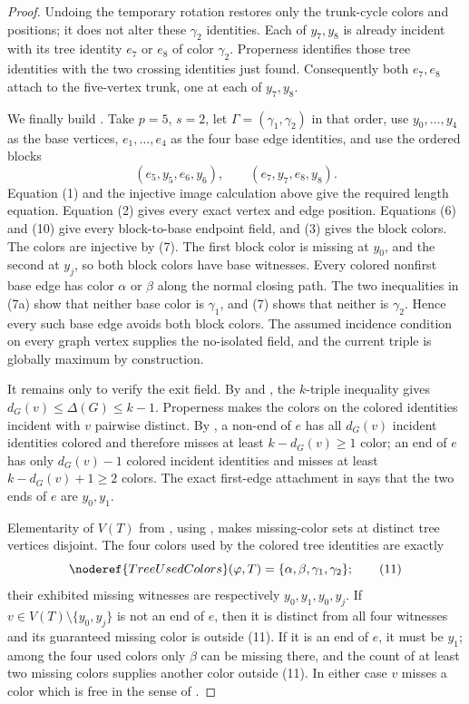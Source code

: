 \begin{proof}
Undoing the temporary rotation restores only the trunk-cycle colors and
positions; it does not alter these $\gamma_2$ identities.  Each of
$y_7,y_8$ is already incident with its tree identity $e_7$ or $e_8$ of
color $\gamma_2$.  Properness identifies those tree identities with the
two crossing identities just found.  Consequently both $e_7,e_8$ attach
to the five-vertex trunk, one at each of $y_7,y_8$.                

We finally build .  Take $p=5$,
$s=2$, let $\Gamma=(\gamma_1,\gamma_2)$ in that order, use
$y_0,\ldots,y_4$ as the base vertices, $e_1,\ldots,e_4$ as the four base
edge identities, and use the ordered blocks
\[
 (e_5,y_5,e_6,y_6),\qquad(e_7,y_7,e_8,y_8).
\]
Equation (1) and the injective image calculation above give the required
length equation.  Equation (2) gives every exact vertex and edge
position.  Equations (6) and (10) give every block-to-base endpoint
field, and (3) gives the block colors.  The colors are injective by (7).
The first block color is missing at $y_0$, and the second at $y_j$, so
both block colors have base witnesses.  Every colored nonfirst base edge
has color $\alpha$ or $\beta$ along the normal closing path.  The two
inequalities in (7a) show that neither base color is $\gamma_1$, and (7)
shows that neither is $\gamma_2$.  Hence every such base edge avoids both
block colors.  The assumed
incidence condition on every graph vertex supplies the no-isolated field,
and the current triple is globally maximum by construction.

It remains only to verify the exit field.  By  and
, the $k$-triple inequality gives
$d_G(v)\leq\Delta(G)\leq k-1$.  Properness makes the colors on the colored
identities incident with $v$ pairwise distinct.  By
, a non-end of $e$ has all $d_G(v)$ incident
identities colored and therefore misses at least $k-d_G(v)\geq1$ color;
an end of $e$ has only $d_G(v)-1$ colored incident identities and misses
at least $k-d_G(v)+1\geq2$ colors.  The exact first-edge attachment in
 says that the two ends of $e$ are $y_0,y_1$.

Elementarity of $V(T)$ from , using
, makes missing-color sets at distinct
tree vertices disjoint.  The four colors
used by the colored tree identities are exactly
\[
 \noderef{TreeUsedColors}(\varphi,T)
   =\{\alpha,\beta,\gamma_1,\gamma_2\};              \tag{11}
\]
their exhibited missing witnesses are respectively
$y_0,y_1,y_0,y_j$.  If $v\in V(T)\setminus\{y_0,y_j\}$ is not an end of
$e$, then it is distinct from all four witnesses and its guaranteed
missing color is outside (11).  If it is an end of $e$, it must be
$y_1$; among the four used colors only $\beta$ can be missing there, and
the count of at least two missing colors supplies another color outside
(11).  In either case $v$ misses a color which is free in the sense of
.


\end{proof}
